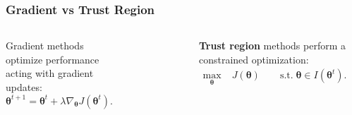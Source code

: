 \documentclass[english,aspectratio=1610]{beamer}
\theoremstyle{mystyle}
\theoremstyle{mystyle}
\theoremstyle{mystyle}
\begin{document}
\begin{frame}[t]
\frametitle{Gradient vs Trust Region}
\begin{columns}[T]
\centering
	Gradient methods optimize performance acting with gradient updates:
	\begin{equation*}
		\bm{\theta}^{t+1} = \bm{\theta}^{t} + \lambda \nabla_{\bm{\theta}}  J(\bm{\theta}^t) .
	\end{equation*}
	\vspace{-1cm}
	\begin{figure}
		\centering
		\includegraphics[height=0.55\textheight]{pictures/gradient_methods_arrow}
	\end{figure}
\centering
\textbf{Trust region} methods perform a constrained optimization:
	\begin{align*}
 		\max_{\bm{\theta}} \; & J(\bm{\theta}) \qquad \text{s.t.} \; \bm{\theta} \in I(\bm{\theta}^t).
 	\end{align*}
 	\vspace{-1cm}
 	\begin{figure}
		\centering
		\includegraphics[height=0.55\textheight]{pictures/information_theoretic}
	\end{figure}
	\end{columns}
\end{frame} 
\end{document}
